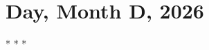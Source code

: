 \documentclass[a4paper]{report}
\institute{Technion}
\date{Based on lectures by \profloc{} in 2026--27
\\ Notes created by Daniel Haim Breger
\\~\\ Updated \today}
\begin{document}
\renewcommand\thepage{Title}
\maketitle
\renewcommand\thepage{Preface}


\newpage
\pagestyle{plain}
\tableofcontents
\newpage
\pagestyle{head}

\chapter{Day, Month D, 2026}


\centering
* * *
\end{document}
